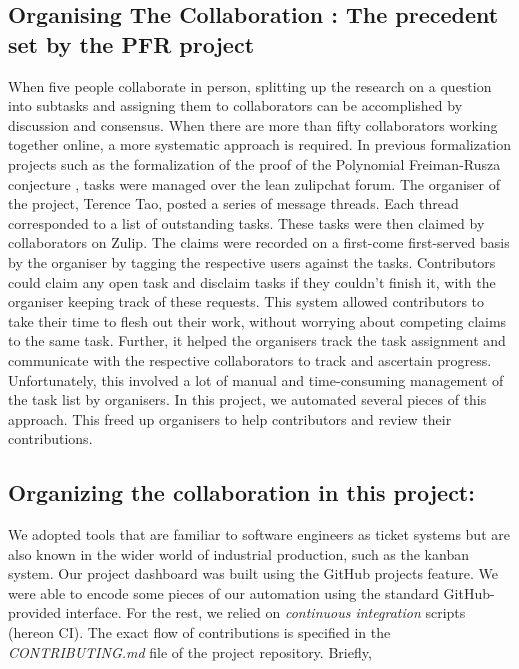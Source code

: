 \subsection{Organising The Collaboration : The precedent set by the PFR project}
When five people collaborate in person, splitting up the research on a question into subtasks and assigning them to collaborators can be accomplished by discussion and consensus. When there are more than fifty collaborators working together online, a more systematic approach is required. In previous formalization projects such as the formalization of the proof of the Polynomial Freiman-Rusza conjecture \cite{PFR_Tao_Dilles_2023}, tasks were managed over the lean zulipchat forum. The organiser of the project, Terence Tao, posted a series of message threads. Each thread corresponded to a list of outstanding tasks. These tasks were then claimed by collaborators on Zulip. The claims were recorded on a first-come first-served basis by the organiser by tagging the respective users against the tasks. Contributors could claim any open task and disclaim tasks if they couldn't finish it, with the organiser keeping track of these requests. This system allowed contributors to take their time to flesh out their work, without worrying about competing claims to the same task. Further, it helped the organisers track the task assignment and communicate with the respective collaborators to track and ascertain progress. Unfortunately, this involved a lot of manual and time-consuming management of the task list by organisers. In this project, we automated several pieces of this approach. This freed up organisers to help contributors and review their contributions.

\subsection{Organizing the collaboration in this project:}
We adopted tools that are familiar to software engineers as ticket systems but are also known in the wider world of industrial production, such as the kanban system. Our project dashboard was built using the GitHub projects feature. We were able to encode some pieces of our automation using the standard GitHub-provided interface. For the rest, we relied on \emph{continuous integration} scripts (hereon CI). The exact flow of contributions is specified in the \emph{CONTRIBUTING.md} file of the project repository\cite{The_Equational_Theories_repository}. Briefly,

